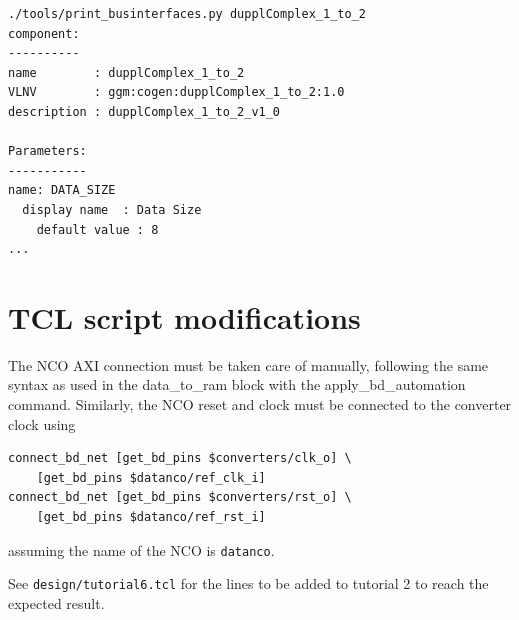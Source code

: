 \documentclass[12pt,oneside]{article}
\begin{document}
{\footnotesize
\begin{verbatim}
./tools/print_businterfaces.py dupplComplex_1_to_2
component:
----------
name        : dupplComplex_1_to_2
VLNV        : ggm:cogen:dupplComplex_1_to_2:1.0
description : dupplComplex_1_to_2_v1_0

Parameters:
-----------
name: DATA_SIZE
  display name  : Data Size
    default value : 8
...
\end{verbatim}
}

\section{TCL script modifications}

The NCO AXI connection must be taken care of manually, following the same syntax as used in the data\_to\_ram block
with the apply\_bd\_automation command. Similarly, the NCO reset and clock must be connected to the converter clock
using 
{\footnotesize
\begin{verbatim}
connect_bd_net [get_bd_pins $converters/clk_o] \
	[get_bd_pins $datanco/ref_clk_i]
connect_bd_net [get_bd_pins $converters/rst_o] \
	[get_bd_pins $datanco/ref_rst_i]
\end{verbatim}
}
\noindent assuming the name of the NCO is {\tt datanco}.

See {\tt design/tutorial6.tcl} for the lines to be added to tutorial 2 to reach the expected result.
\end{document}
